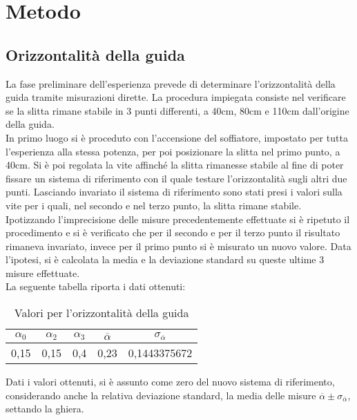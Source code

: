 \documentclass[a4paper,11pt,oneside]{article}
\begin{document}
\section{Metodo}
\subsection{Orizzontalità della guida}
La fase preliminare dell'esperienza prevede di determinare l'orizzontalità della guida tramite misurazioni dirette. La procedura impiegata consiste nel verificare se la slitta rimane stabile in 3 punti differenti, a 40cm, 80cm e 110cm dall'origine della guida.\\
In primo luogo si è proceduto con l'accensione del soffiatore, impostato per tutta l'esperienza alla stessa potenza, per poi posizionare la slitta nel primo punto, a 40cm. Si è poi regolata la vite affinché la slitta rimanesse stabile al fine di poter fissare un sistema di riferimento con il quale testare l'orizzontalità sugli altri due punti. Lasciando invariato il sistema di riferimento sono stati presi i valori sulla vite per i quali, nel secondo  e nel terzo punto, la slitta rimane stabile.\\
Ipotizzando l'imprecisione delle misure precedentemente effettuate si è ripetuto il procedimento e si è verificato che per il secondo e per il terzo punto il risultato rimaneva invariato, invece per il primo punto si è misurato un nuovo valore. Data l'ipotesi, si è calcolata la media e la deviazione standard su queste ultime 3 misure effettuate.\\
La seguente tabella riporta i dati ottenuti:

\begin{table}[h]
    \centering
        \caption{Valori per l'orizzontalità della guida}

\begin{tabular}{ccc|cc}

    \toprule
    $\alpha_{0}$&$\alpha_{2}$&$\alpha_{3}$&$\overline{\alpha}$&$\sigma_{\overline{\alpha}}$\\
    \midrule
0,15&0,15&0,4&0,23&0,1443375672 \\
    \bottomrule
    \end{tabular}
    \label{tab:guida_orizzontale}
\end{table}
Dati i valori ottenuti, si è assunto come zero del nuovo sistema di riferimento, considerando anche la relativa deviazione standard, la media delle misure $\overline{\alpha} \pm \sigma_{\overline{\alpha}}$, settando la ghiera.\\
\end{document}
